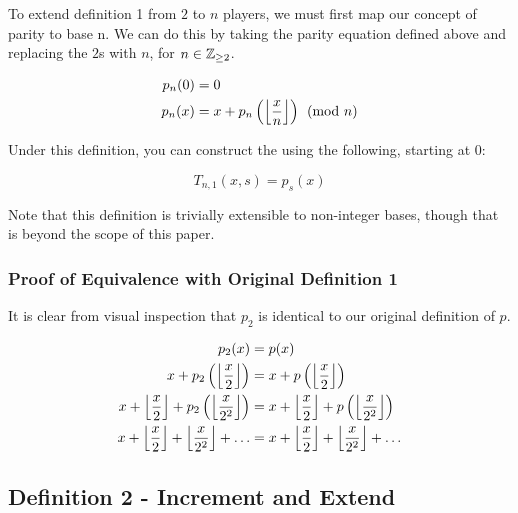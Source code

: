 \documentclass[conference]{IEEEtran}
\begin{document}
To extend definition 1 from $2$ to $n$ players, we must first map our concept of parity to base n. We can do this by taking the parity equation defined above and replacing the $2$s with $n$, for $n \in \mathbb{Z}_{\ge 2}$.

\begin{equation}
    \begin{aligned}
p_n(0) &= 0 \\
p_n(x) &= x + p_n\left(\left\lfloor \dfrac{x}{n} \right\rfloor\right) \pmod{n}
    \end{aligned}
\end{equation}

Under this definition, you can construct the \TMS using the following, starting at 0:

\begin{equation}
    \label{eq:pnd01}
    T_{n,1}(x, s) = p_s(x)
\end{equation}

Note that this definition is trivially extensible to non-integer bases, though that is beyond the scope of this paper.

\subsubsection{Proof of Equivalence with Original Definition 1}

It is clear from visual inspection that $p_2$ is identical to our original definition of $p$.

\begin{equation}
    \begin{aligned}
                                                           p_2(x) &= p(x) \\
                         x + p_2\left(\left\lfloor \dfrac{x}{2} \right\rfloor\right) &= x + p\left(\left\lfloor \dfrac{x}{2} \right\rfloor\right) \\
x + \left\lfloor \dfrac{x}{2} \right\rfloor + p_2\left(\left\lfloor \dfrac{x}{2^2} \right\rfloor\right) &= x + \left\lfloor \dfrac{x}{2} \right\rfloor + p\left(\left\lfloor \dfrac{x}{2^2} \right\rfloor\right) \\
       x + \left\lfloor \dfrac{x}{2} \right\rfloor + \left\lfloor \dfrac{x}{2^2} \right\rfloor + \ldots &= x + \left\lfloor \dfrac{x}{2} \right\rfloor + \left\lfloor \dfrac{x}{2^2} \right\rfloor + \ldots
    \end{aligned}
\end{equation}

\subsection{Definition 2 - Increment and Extend}
\end{document}
